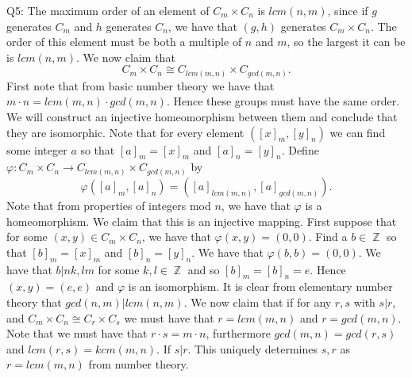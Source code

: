\documentclass[letterpaper]{article}
\DeclareMathOperator{\Z}{\mathbb{Z}}
\begin{document}
\noindent Q5: The maximum order of an element of $C_m \times C_n$ is $lcm(n,m)$, since if $g$ generates $C_m$ and $h$ generates $C_n$, we have that $(g,h)$ generates $C_m \times C_n$. The order of this element must be both a multiple of $n$ and $m$, so the largest it can be is $lcm(n,m)$. We now claim that $$C_m \times C_n \cong C_{lcm(m,n)} \times C_{gcd(m,n)}.$$
First note that from basic number theory we have that $m\cdot n = lcm(m,n) \cdot gcd(m,n)$. Hence these groups must have the same order. We will construct an injective homeomorphism between them and conclude that they are isomorphic. Note that for every element $([x]_m, [y]_n)$ we can find some integer $a$ so that $[a]_m = [x]_m$ and $[a]_n = [y]_n$. Define $\varphi: C_m \times C_n \to C_{lcm(m,n)} \times C_{gcd(m,n)}$ by $$\varphi([a]_m , [a]_n) = ([a]_{lcm(m,n)}, [a]_{gcd(m,n)}). $$
Note that from properties of integers mod $n$, we have that $\varphi$ is a homeomorphism. We claim that this is an injective mapping. First suppose that for some $(x,y) \in C_m \times C_n$, we have that $\varphi(x,y) = (0,0)$. Find a $b\in \Z$ so that $[b]_m  = [x]_m$ and $[b]_n = [y]_n$. We have that $\varphi(b,b) = (0,0)$. We have that $b |nk , lm $ for some $k,l \in \Z$ and so $[b]_m = [b]_n = e$. Hence $(x,y) = (e,e)$ and $\varphi $ is an isomorphism. It is clear from elementary number theory that $gcd(n,m) | lcm(n,m)$. We now claim that if for any $r,s $ with $s|r$, and $C_m \times C_n \cong C_r \times C_s$ we must have that $r = lcm(m,n) $ and $r = gcd(m,n)$. 
Note that we must have that $r\cdot s = m \cdot n$, furthermore $gcd(m,n) = gcd(r,s)$ and $lcm(r,s) = kcm(m,n)$. If $s|r$. This uniquely determines $s,r$ as $r = lcm(m,n)$ from number theory. 
\end{document}
